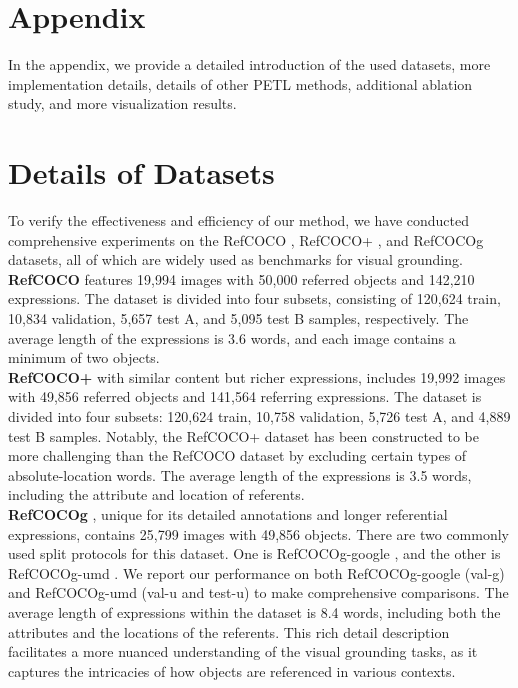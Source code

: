 \newpage

\section*{Appendix}

In the appendix, we provide a detailed introduction of the used datasets, more implementation details, details of other PETL methods, additional ablation study, and more visualization results. 

\section{Details of Datasets}

To verify the effectiveness and efficiency of our method, we have conducted comprehensive experiments on the RefCOCO \cite{yu2016modeling}, RefCOCO+ \cite{yu2016modeling}, and RefCOCOg \cite{mao2016refcocogg} datasets, all of which are widely used as benchmarks for visual grounding.
\\
\textbf{RefCOCO} features 19,994 images with 50,000 referred objects and 142,210 expressions. The dataset is divided into four subsets, consisting of 120,624 train, 10,834 validation, 5,657 test A, and 5,095 test B samples, respectively. The average length of the expressions is 3.6 words, and each image contains a minimum of two objects.
\\
\textbf{RefCOCO+} with similar content but richer expressions, includes 19,992 images with 49,856 referred objects and 141,564 referring expressions. The dataset is divided into four subsets: 120,624 train, 10,758 validation, 5,726 test A, and 4,889 test B samples. Notably, the RefCOCO+ dataset has been constructed to be more challenging than the RefCOCO dataset by excluding certain types of absolute-location words. The average length of the expressions is 3.5 words, including the attribute and location of referents.
\\
\textbf{RefCOCOg} , unique for its detailed annotations and longer referential expressions, contains 25,799 images with 49,856 objects. There are two commonly used split protocols for this dataset. One is RefCOCOg-google \cite{mao2016refcocogg}, and the other is RefCOCOg-umd \cite{nagaraja2016refcocogu}. We report our performance on both RefCOCOg-google (val-g) and RefCOCOg-umd (val-u and test-u) to make comprehensive comparisons. The average length of expressions within the dataset is 8.4 words, including both the attributes and the locations of the referents. This rich detail description facilitates a more nuanced understanding of the visual grounding tasks, as it captures the intricacies of how objects are referenced in various contexts.

